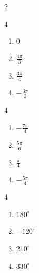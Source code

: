 \documentclass{ximera}
\begin{document}
\begin{multicols}{2}
\begin{enumerate}
\setcounter{HW}{\value{enumi}}

\end{enumerate}

\end{multicols}

\begin{multicols}{4}

\begin{enumerate}

\setcounter{enumi}{\value{HW}}

\item $0$ 
\item $\frac{4\pi}{3}$
\item $\frac{3\pi}{4}$
\item $-\frac{3\pi}{2}$

\setcounter{HW}{\value{enumi}}

\end{enumerate}

\end{multicols}

\begin{multicols}{4}

\begin{enumerate}

\setcounter{enumi}{\value{HW}}

\item $-\frac{7\pi}{4}$
\item $\frac{5\pi}{6}$
\item $\frac{\pi}{4}$ 
\item $-\frac{5\pi}{4}$

\setcounter{HW}{\value{enumi}}

\end{enumerate}

\end{multicols}

\begin{multicols}{4}

\begin{enumerate}

\setcounter{enumi}{\value{HW}}

\item $180^{\circ}$
\item $-120^{\circ}$
\item $210^{\circ}$
\item $330^{\circ}$

\setcounter{HW}{\value{enumi}}

\end{enumerate}

\end{multicols}
\end{document}
